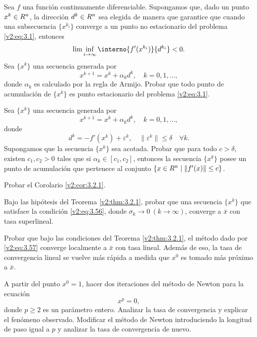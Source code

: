 \begin{exercise}\label{v2:ejer:3.1.16}
    Sea $f$ una función continuamente diferenciable. Supongamos que, dado un punto $x^k \in R^n$, la dirección $d^k \in R^n$ sea elegida de manera que garantice que cuando una subsecuencia $\{x^{k_i}\}$ converge a un punto no estacionario del problema \eqref{v2:eq:3.1}, entonces
    \[
        \lim \inf_{i \to \infty} \interno{f'(x^{k_i})}{d^{k_i}} < 0.
    \]
    Sea $\{x^k\}$ una secuencia generada por
    \[
        x^{k+1} = x^k + \alpha_k d^k, \quad k = 0, 1, \dots,
    \]
    donde $\alpha_k$ es calculado por la regla de Armijo. Probar que todo punto de acumulación de $\{x^k\}$ es punto estacionario del problema \eqref{v2:eq:3.1}.
\end{exercise}

\begin{exercise}\label{v2:ejer:3.1.17}
    Sea $\{x^k\}$ una secuencia generada por
    \[
        x^{k+1} = x^k + \alpha_k d^k, \quad k = 0, 1, \dots,
    \]
    donde
    \[
        d^k = -f'(x^k) + \varepsilon^k, \quad \|\varepsilon^k\| \le \delta \quad \forall k.
    \]
    Supongamos que la secuencia $\{x^k\}$ sea acotada. Probar que para todo $c > \delta$, existen $c_1, c_2 > 0$ tales que si $\alpha_k \in [c_1, c_2]$, entonces la secuencia $\{x^k\}$ posee un punto de acumulación que pertenece al conjunto $\{x \in R^n \mid \|f'(x)\| \le c\}$.
\end{exercise}

\begin{exercise}\label{v2:ejer:3.2.1}
    Probar el Corolario \ref{v2:cor:3.2.1}.
\end{exercise}

\begin{exercise}\label{v2:ejer:3.2.2}
    Bajo las hipótesis del Teorema \ref{v2:thm:3.2.1}, probar que una secuencia $\{x^k\}$ que satisface la condición \eqref{v2:eq:3.56}, donde $\sigma_k \to 0 \ (k \to \infty)$, converge a $\bar{x}$ con tasa superlineal.
\end{exercise}

\begin{exercise}\label{v2:ejer:3.2.3}
    Probar que bajo las condiciones del Teorema \ref{v2:thm:3.2.1}, el método dado por \eqref{v2:eq:3.57} converge localmente a $\bar{x}$ con tasa lineal. Además de eso, la tasa de convergencia lineal se vuelve más rápida a medida que $x^0$ es tomado más próximo a $\bar{x}$.
\end{exercise}

\begin{exercise}\label{v2:ejer:3.2.4}
    A partir del punto $x^0 = 1$, hacer dos iteraciones del método de Newton para la ecuación
    \[
        x^p = 0,
    \]
    donde $p \ge 2$ es un parámetro entero. Analizar la tasa de convergencia y explicar el fenómeno observado. Modificar el método de Newton introduciendo la longitud de paso igual a $p$ y analizar la tasa de convergencia de nuevo.
\end{exercise}

